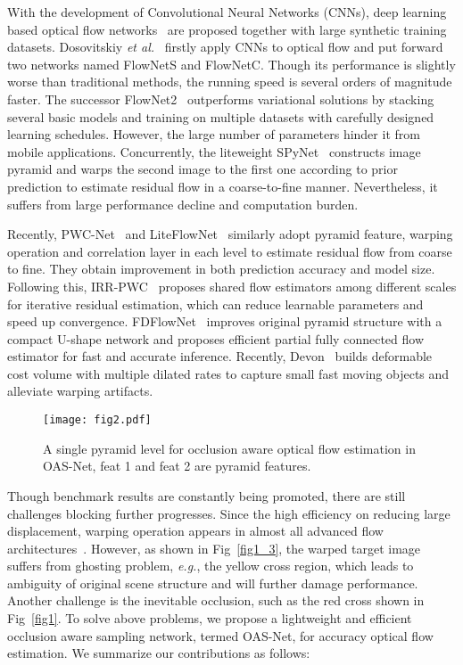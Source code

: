\documentclass{article}
\begin{document}
With the development of Convolutional Neural Networks (CNNs), deep learning based optical flow networks~\cite{Fischer2015FlowNetLO,Ilg2017FlowNet2E,Sun_2018_CVPR} are proposed together with large synthetic training datasets. Dosovitskiy \textit{et al.}~\cite{Fischer2015FlowNetLO} firstly apply CNNs to optical flow and put forward two networks named FlowNetS and FlowNetC. Though its performance is slightly worse than traditional methods, the running speed is several orders of magnitude faster. The successor FlowNet2~\cite{Ilg2017FlowNet2E} outperforms variational solutions by stacking several basic models and training on multiple datasets with carefully designed learning schedules. However, the large number of parameters hinder it from mobile applications. Concurrently, the liteweight SPyNet~\cite{Ranjan_2017_CVPR} constructs image pyramid and warps the second image to the first one according to prior prediction to estimate residual flow in a coarse-to-fine manner. Nevertheless, it suffers from large performance decline and computation burden.

Recently, PWC-Net~\cite{Sun_2018_CVPR} and LiteFlowNet~\cite{Hui_2018_CVPR} similarly adopt pyramid feature, warping operation and correlation layer in each level to estimate residual flow from coarse to fine. They obtain improvement in both prediction accuracy and model size. Following this, IRR-PWC~\cite{Hur_2019_IRR} proposes shared flow estimators among different scales for iterative residual estimation, which can reduce learnable parameters and speed up convergence. FDFlowNet~\cite{Kong_2020} improves original pyramid structure with a compact U-shape network and proposes efficient partial fully connected flow estimator for fast and accurate inference. Recently, Devon~\cite{Lu_2020_WACV} builds deformable cost volume with multiple dilated rates to capture small fast moving objects and alleviate warping artifacts.

\begin{figure*}[t]
	\centering
	\texttt{[image: fig2.pdf]}
	\caption{A single pyramid level for occlusion aware optical flow estimation in OAS-Net, feat 1 and feat 2 are pyramid features.}
	\label{fig2}
	\vspace{-0.5 em}
\end{figure*}

Though benchmark results are constantly being promoted, there are still challenges blocking further progresses. Since the high efficiency on reducing large displacement, warping operation appears in almost all advanced flow architectures~\cite{Ilg2017FlowNet2E,Ranjan_2017_CVPR,Sun_2018_CVPR,Hui_2018_CVPR, Hur_2019_IRR,Yin_2019_CVPR,Kong_2020}. However, as shown in Fig~\ref{fig1_3}, the warped target image suffers from ghosting problem, \textit{e.g.}, the yellow cross region, which leads to ambiguity of original scene structure and will further damage performance. Another challenge is the inevitable occlusion, such as the red cross shown in Fig~\ref{fig1}. To solve above problems, we propose a lightweight and efficient occlusion aware sampling network, termed OAS-Net, for accuracy optical flow estimation. We summarize our contributions as follows:
\end{document}
